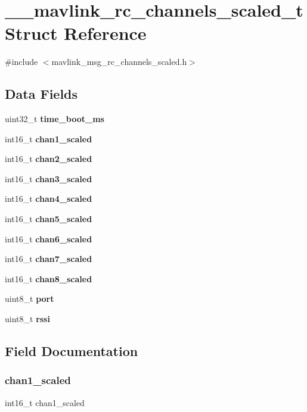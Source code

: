 \section{\+\_\+\+\_\+mavlink\+\_\+rc\+\_\+channels\+\_\+scaled\+\_\+t Struct Reference}
\label{struct____mavlink__rc__channels__scaled__t}


{\ttfamily \#include $<$mavlink\+\_\+msg\+\_\+rc\+\_\+channels\+\_\+scaled.\+h$>$}

\subsection*{Data Fields}
\begin{DoxyCompactItemize}
\item 
uint32\+\_\+t \textbf{ time\+\_\+boot\+\_\+ms}
\item 
int16\+\_\+t \textbf{ chan1\+\_\+scaled}
\item 
int16\+\_\+t \textbf{ chan2\+\_\+scaled}
\item 
int16\+\_\+t \textbf{ chan3\+\_\+scaled}
\item 
int16\+\_\+t \textbf{ chan4\+\_\+scaled}
\item 
int16\+\_\+t \textbf{ chan5\+\_\+scaled}
\item 
int16\+\_\+t \textbf{ chan6\+\_\+scaled}
\item 
int16\+\_\+t \textbf{ chan7\+\_\+scaled}
\item 
int16\+\_\+t \textbf{ chan8\+\_\+scaled}
\item 
uint8\+\_\+t \textbf{ port}
\item 
uint8\+\_\+t \textbf{ rssi}
\end{DoxyCompactItemize}


\subsection{Field Documentation}
\mbox{\label{struct____mavlink__rc__channels__scaled__t_a9b8ba06abfbf6f0139b8c23d4ffcf8ac}} 
\subsubsection{chan1\+\_\+scaled}
{\footnotesize\ttfamily int16\+\_\+t chan1\+\_\+scaled}

